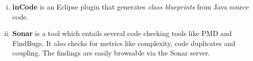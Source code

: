 \documentclass[a4paper, 10pt]{article}
\begin{document}

\begin{enumerate}[i)]
\item \textbf{inCode} is an Eclipse plugin that generates \emph{class
    blueprints} from Java source code.
\item \textbf{Sonar}
	is a tool which entails several code checking tools like PMD and FindBugs. It also checks for metrics like complexity, code duplicates and coupling.
	The findings are easily browsable via the Sonar server.
\end{enumerate}


\end{document}
